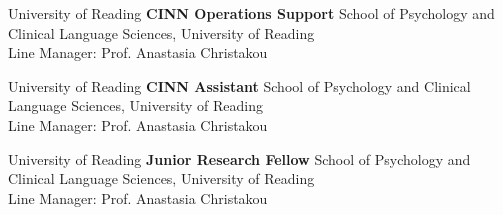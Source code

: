 {University of Reading}
{\textbf{CINN Operations Support}}
{School of Psychology and Clinical Language Sciences, University of Reading \\
Line Manager: Prof. Anastasia Christakou}

{University of Reading}
{\textbf{CINN Assistant}}
{School of Psychology and Clinical Language Sciences, University of Reading \\
Line Manager: Prof. Anastasia Christakou}

{University of Reading}
{\textbf{Junior Research Fellow}}
{School of Psychology and Clinical Language Sciences, University of Reading \\
Line Manager: Prof. Anastasia Christakou}
